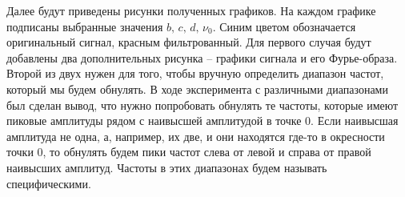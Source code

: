 \documentclass[a4paper, 12pt]{article}
\begin{document}
    Далее будут приведены рисунки полученных графиков. На каждом графике подписаны выбранные значения $b,\,c,\,d,\,\nu_0$. 
    Синим цветом обозначается оригинальный сигнал, красным фильтрованный. Для первого случая будут
    добавлены два дополнительных рисунка -- графики сигнала и его Фурье-образа. Второй из двух нужен для того, чтобы вручную определить
    диапазон частот, который мы будем обнулять. В ходе эксперимента с различными диапазонами был сделан вывод, что нужно попробовать
    обнулять те частоты, которые имеют пиковые амплитуды рядом с наивысшей амплитудой в точке 0. Если наивысшая амплитуда не одна, а, например,
    их две, и они находятся где-то в окресности точки 0, то обнулять будем пики частот слева от левой и справа от правой наивысших амплитуд.
    Частоты в этих диапазонах будем называть специфическими.
\end{document}
